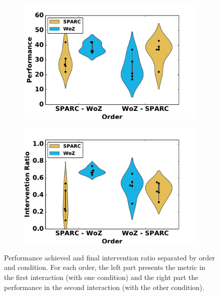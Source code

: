 
\begin{figure}[ht]
	\centering
	\begin{subfigure}[t]{0.5\textwidth}
		\centering
		\includegraphics[width=1.\textwidth]{perf_divided.pdf}
	\end{subfigure}%
	\begin{subfigure}[t]{0.5\textwidth}
		\centering
		\includegraphics[width=1.\textwidth]{ratio_divided.pdf}
	\end{subfigure}
	\caption{Performance achieved and final intervention ratio separated by order and condition. For each order, the left part presents the metric in the first interaction (with one condition) and the right part the performance in the second interaction (with the other condition).}
	\label{fig:woz_separated}
\end{figure}


